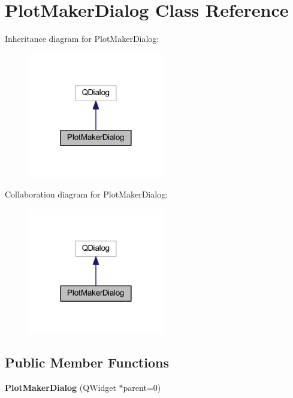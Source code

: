 \hypertarget{class_plot_maker_dialog}{\section{Plot\+Maker\+Dialog Class Reference}
\label{class_plot_maker_dialog}
}


Inheritance diagram for Plot\+Maker\+Dialog\+:\nopagebreak
\begin{figure}[H]
\begin{center}
\leavevmode
\includegraphics[width=168pt]{class_plot_maker_dialog__inherit__graph}
\end{center}
\end{figure}


Collaboration diagram for Plot\+Maker\+Dialog\+:\nopagebreak
\begin{figure}[H]
\begin{center}
\leavevmode
\includegraphics[width=168pt]{class_plot_maker_dialog__coll__graph}
\end{center}
\end{figure}
\subsection*{Public Member Functions}
\begin{DoxyCompactItemize}
\item 
\hypertarget{class_plot_maker_dialog_a42623a56caf5ade245879e64942bfcb4}{{\bfseries Plot\+Maker\+Dialog} (Q\+Widget $\ast$parent=0)}\label{class_plot_maker_dialog_a42623a56caf5ade245879e64942bfcb4}

\end{DoxyCompactItemize}


